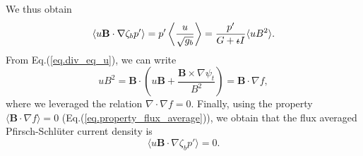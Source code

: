\documentclass[my_thesis.tex]{subfiles}
\begin{document}
We thus obtain
\begin{equation}
	\left\langle u\mathbf{B}\cdot\nabla\zeta_b p'\right\rangle = p' \left\langle \frac{u}{\sqrt {g_b}}\right\rangle = \frac{p'}{G+\text{$\iota\!\!$-} I}\langle uB^2 \rangle.
\end{equation}
From Eq.(\ref{eq.div_eq_u}), we can write
\begin{equation}
	uB^2 = \mathbf{B}\cdot\left(u\mathbf{B}+\frac{\mathbf{B}\times\nabla\psi_t}{B^2}\right) = \mathbf{B}\cdot\nabla f,
\end{equation}
where we leveraged the relation $\nabla\cdot\nabla f = 0$. Finally, using the property $\langle \mathbf{B}\cdot\nabla f\rangle = 0$ (Eq.(\ref{eq.property_flux_average})), we obtain that the flux averaged Pfirsch-Schl\"uter current density is
\begin{equation}
	\langle  u\mathbf{B}\cdot\nabla\zeta_b p'\rangle = 0.
\end{equation}
\end{document}
